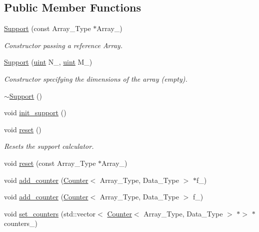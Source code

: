 \subsection*{Public Member Functions}
\begin{DoxyCompactItemize}
\item 
\hyperlink{class_support_a4a0587bc6f1f268005a94fea039ea6ba}{Support} (const Array\+\_\+\+Type $\ast$Array\+\_\+)
\begin{DoxyCompactList}\small\item\em Constructor passing a reference Array. \end{DoxyCompactList}\item 
\hyperlink{class_support_aff7d2705d6f765fcbd8958453b7dbefe}{Support} (\hyperlink{typedefs_8hpp_a91ad9478d81a7aaf2593e8d9c3d06a14}{uint} N\+\_\+, \hyperlink{typedefs_8hpp_a91ad9478d81a7aaf2593e8d9c3d06a14}{uint} M\+\_\+)
\begin{DoxyCompactList}\small\item\em Constructor specifying the dimensions of the array (empty). \end{DoxyCompactList}\item 
\hyperlink{class_support_a03228371869980fa356b7b86871d94e8}{$\sim$\+Support} ()
\item 
void \hyperlink{class_support_aef6fda6e7a0989f53fcd252609d770c9}{init\+\_\+support} ()
\item 
void \hyperlink{class_support_a5878ac60282fc1380c92f3ba502f249e}{reset} ()
\begin{DoxyCompactList}\small\item\em Resets the support calculator. \end{DoxyCompactList}\item 
void \hyperlink{class_support_afbe207cc2762bc698c9ccb3212e9de78}{reset} (const Array\+\_\+\+Type $\ast$Array\+\_\+)
\item 
void \hyperlink{class_support_a0ad8bb6202451253697d771a28859210}{add\+\_\+counter} (\hyperlink{class_counter}{Counter}$<$ Array\+\_\+\+Type, Data\+\_\+\+Type $>$ $\ast$f\+\_\+)
\item 
void \hyperlink{class_support_aa8680937a0237286a8b0401bca07cbf6}{add\+\_\+counter} (\hyperlink{class_counter}{Counter}$<$ Array\+\_\+\+Type, Data\+\_\+\+Type $>$ f\+\_\+)
\item 
void \hyperlink{class_support_a07f225ee54158980ededaccc47abad4c}{set\+\_\+counters} (std\+::vector$<$ \hyperlink{class_counter}{Counter}$<$ Array\+\_\+\+Type, Data\+\_\+\+Type $>$ $\ast$$>$ $\ast$counters\+\_\+)
$$
\end{DoxyCompactItemize}
